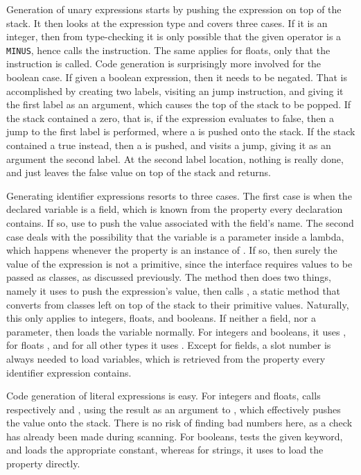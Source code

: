 Generation of unary expressions starts by pushing the expression on top of the stack. It then looks at the expression type and covers three cases. If it is an integer, then from type-checking it is only possible that the given operator is a \texttt{MINUS}, hence  calls the  instruction. The same applies for floats, only that the  instruction is called. Code generation is surprisingly more involved for the boolean case. If given a boolean expression, then it needs to be negated. That is accomplished by creating two labels, visiting an  jump instruction, and giving it the first label as an argument, which causes the top of the stack to be popped. If the stack contained a zero, that is, if the expression evaluates to false, then a jump to the first label is performed, where a  is pushed onto the stack. If the stack contained a true instead, then a  is pushed, and  visits a  jump, giving it as an argument the second label. At the second label location, nothing is really done, and  just leaves the false value on top of the stack and returns.

Generating identifier expressions resorts to three cases. The first case is when the declared variable is a field, which is known from the  property every declaration contains. If so,  use  to push the value associated with the field's name. The second case deals with the possibility that the variable is a parameter inside a lambda, which happens whenever the  property is an instance of . If so, then surely the value of the expression is not a primitive, since the  interface requires values to be passed as classes, as discussed previously. The  method then does two things, namely it uses  to push the expression's value, then calls , a static method that converts from classes left on top of the stack to their primitive values. Naturally, this only applies to integers, floats, and booleans. If neither a field, nor a parameter, then  loads the variable normally. For integers and booleans, it uses , for floats , and for all other types it uses . Except for fields, a slot number is always needed to load variables, which is retrieved from the  property every identifier expression contains.

Code generation of literal expressions is easy. For integers and floats,  calls respectively  and , using the result as an argument to , which effectively pushes the value onto the stack. There is no risk of finding bad numbers here, as a check has already been made during scanning. For booleans,  tests the given keyword, and loads the appropriate constant, whereas for strings, it uses  to load the  property directly.

